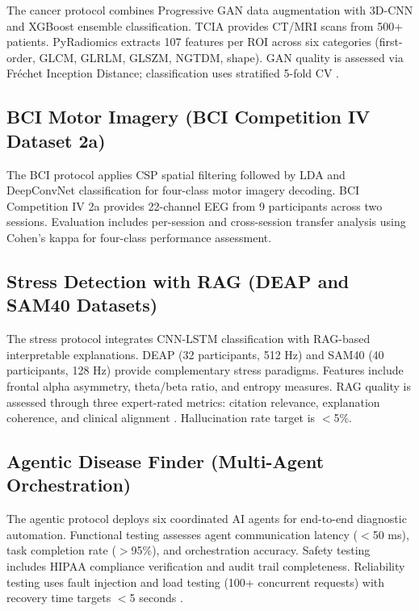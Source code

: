 The cancer protocol combines Progressive GAN data augmentation with 3D-CNN and XGBoost ensemble classification. TCIA \citep{clark2014tcia} provides CT/MRI scans from 500+ patients. PyRadiomics \citep{vanGriethuysen2017pyradiomics} extracts 107 features per ROI across six categories (first-order, GLCM, GLRLM, GLSZM, NGTDM, shape). GAN quality is assessed via Fr\'{e}chet Inception Distance; classification uses stratified 5-fold CV \citep{chen2016xgboost}.

\subsection{BCI Motor Imagery (BCI Competition IV Dataset 2a)}
\label{sec:bci_method}

The BCI protocol applies CSP spatial filtering \citep{ramoser2000csp} followed by LDA and DeepConvNet classification for four-class motor imagery decoding. BCI Competition IV 2a \citep{tangermann2012review} provides 22-channel EEG from 9 participants across two sessions. Evaluation includes per-session and cross-session transfer analysis using Cohen's kappa for four-class performance assessment.

\subsection{Stress Detection with RAG (DEAP and SAM40 Datasets)}
\label{sec:stress_method}

The stress protocol integrates CNN-LSTM classification with RAG-based interpretable explanations. DEAP \citep{koelstra2012deap} (32 participants, 512 Hz) and SAM40 (40 participants, 128 Hz) provide complementary stress paradigms. Features include frontal alpha asymmetry, theta/beta ratio, and entropy measures. RAG quality is assessed through three expert-rated metrics: citation relevance, explanation coherence, and clinical alignment \citep{lewis2020rag, gao2024rag}. Hallucination rate target is $<$5\%.

\subsection{Agentic Disease Finder (Multi-Agent Orchestration)}
\label{sec:agentic_method}

The agentic protocol deploys six coordinated AI agents for end-to-end diagnostic automation. Functional testing assesses agent communication latency ($<$50 ms), task completion rate ($>$95\%), and orchestration accuracy. Safety testing includes HIPAA compliance verification and audit trail completeness. Reliability testing uses fault injection and load testing (100+ concurrent requests) with recovery time targets $<$5 seconds \citep{wang2024agentai}.

